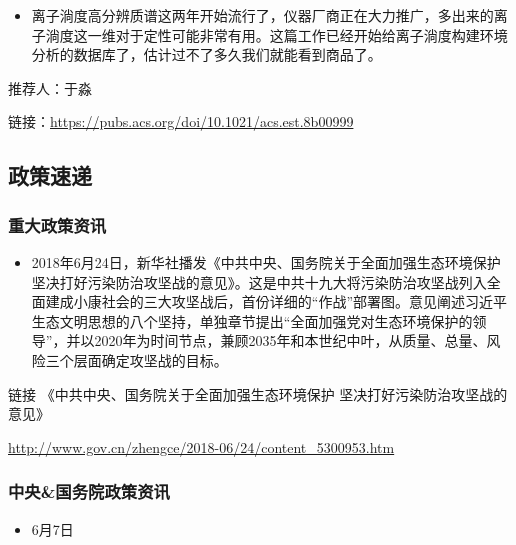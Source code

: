 \documentclass[]{book}
\providecommand{\tightlist}{%
  \setlength{\itemsep}{0pt}\setlength{\parskip}{0pt}}
\begin{document}
\begin{itemize}
\tightlist
\item
  离子淌度高分辨质谱这两年开始流行了，仪器厂商正在大力推广，多出来的离子淌度这一维对于定性可能非常有用。这篇工作已经开始给离子淌度构建环境分析的数据库了，估计过不了多久我们就能看到商品了。
\end{itemize}

推荐人：于淼

链接：\url{https://pubs.acs.org/doi/10.1021/acs.est.8b00999}

\hypertarget{ux653fux7b56ux901fux9012-2}{%
\subsection*{政策速递}\label{ux653fux7b56ux901fux9012-2}}

\hypertarget{ux91cdux5927ux653fux7b56ux8d44ux8baf-2}{%
\subsubsection*{重大政策资讯}\label{ux91cdux5927ux653fux7b56ux8d44ux8baf-2}}

\begin{itemize}
\tightlist
\item
  2018年6月24日，新华社播发《中共中央、国务院关于全面加强生态环境保护 坚决打好污染防治攻坚战的意见》。这是中共十九大将污染防治攻坚战列入全面建成小康社会的三大攻坚战后，首份详细的``作战''部署图。意见阐述习近平生态文明思想的八个坚持，单独章节提出``全面加强党对生态环境保护的领导''，并以2020年为时间节点，兼顾2035年和本世纪中叶，从质量、总量、风险三个层面确定攻坚战的目标。
\end{itemize}

链接 《中共中央、国务院关于全面加强生态环境保护 坚决打好污染防治攻坚战的意见》

\url{http://www.gov.cn/zhengce/2018-06/24/content_5300953.htm}

\hypertarget{ux4e2dux592eux56fdux52a1ux9662ux653fux7b56ux8d44ux8baf-2}{%
\subsubsection*{中央\&国务院政策资讯}\label{ux4e2dux592eux56fdux52a1ux9662ux653fux7b56ux8d44ux8baf-2}}

\begin{itemize}
\tightlist
\item
  6月7日
\end{itemize}
\end{document}
